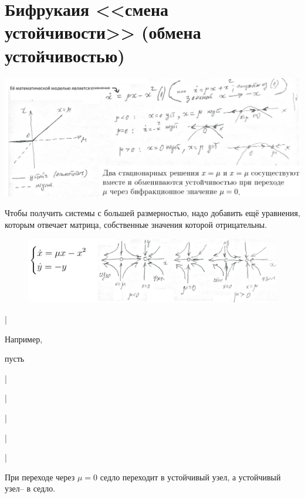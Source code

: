 \documentclass[a4paper,12pt]{article}
\theoremstyle{plain} %
\theoremstyle{definition} %
\theoremstyle{remark} %
\begin{document}
\section{{\large Бифрукаия <<смена устойчивости>> (обмена устойчивостью)}}
\includegraphics[scale=0.65]{11}

Чтобы получить системы с большей размерностью, надо добавить ещё уравнения, которым отвечает матрица, собственные значения которой отрицательны.


\begin{figure}
\includegraphics[scale=0.38]{22}
\end{figure}

|

Например,


пусть

|

|

|

|


|

При переходе через $\mu=0$ седло переходит в устойчивый узел, а устойчивый узел-- в седло.
\end{document}
